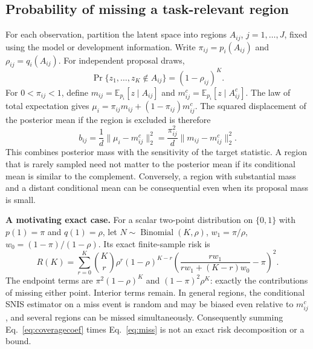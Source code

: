 \documentclass[10pt,letterpaper]{article}
\newcommand{\E}{\mathbb E}
\newcommand{\norm}[1]{\lVert #1\rVert_2}
\begin{document}
\subsection{Probability of missing a task-relevant region}
For each observation, partition the latent space into regions $A_{ij}$, $j=1,\ldots,J$, fixed using the model or development information. Write $\pi_{ij}=p_i(A_{ij})$ and $\rho_{ij}=q_i(A_{ij})$. For independent proposal draws,
\begin{equation}
 \Pr\{z_1,\ldots,z_K\notin A_{ij}\}=(1-\rho_{ij})^K.\label{eq:miss}
\end{equation}
For $0<\pi_{ij}<1$, define $m_{ij}=\E_{p_i}[z\mid A_{ij}]$ and $m_{ij}^{c}=\E_{p_i}[z\mid A_{ij}^c]$. The law of total expectation gives $\mu_i=\pi_{ij}m_{ij}+(1-\pi_{ij})m_{ij}^{c}$. The squared displacement of the posterior mean if the region is excluded is therefore
\begin{equation}
 b_{ij}=\frac1d\norm{\mu_i-m_{ij}^{c}}^2
 =\frac{\pi_{ij}^2}{d}\norm{m_{ij}-m_{ij}^{c}}^2.\label{eq:coveragecoef}
\end{equation}
This combines posterior mass with the sensitivity of the target statistic. A region that is rarely sampled need not matter to the posterior mean if its conditional mean is similar to the complement. Conversely, a region with substantial mass and a distant conditional mean can be consequential even when its proposal mass is small.

\textbf{A motivating exact case.} For a scalar two-point distribution on $\{0,1\}$ with $p(1)=\pi$ and $q(1)=\rho$, let $N\sim\operatorname{Binomial}(K,\rho)$, $w_1=\pi/\rho$, $w_0=(1-\pi)/(1-\rho)$. Its exact finite-sample risk is
\begin{equation}
 R(K)=\sum_{r=0}^K {K\choose r}\rho^r(1-\rho)^{K-r}
 \left(\frac{rw_1}{rw_1+(K-r)w_0}-\pi\right)^2.
\end{equation}
The endpoint terms are $\pi^2(1-\rho)^K$ and $(1-\pi)^2\rho^K$: exactly the contributions of missing either point. Interior terms remain. In general regions, the conditional SNIS estimator on a miss event is random and may be biased even relative to $m_{ij}^{c}$, and several regions can be missed simultaneously. Consequently summing Eq.~\eqref{eq:coveragecoef} times Eq.~\eqref{eq:miss} is not an exact risk decomposition or a bound.
\end{document}
